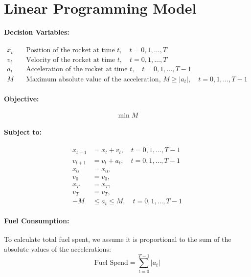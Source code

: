 \documentclass{article}
\begin{document}
\section*{Linear Programming Model}

\paragraph{Decision Variables:}
\begin{align*}
x_t &\quad \text{Position of the rocket at time } t, \quad t = 0, 1, \ldots, T \\
v_t &\quad \text{Velocity of the rocket at time } t, \quad t = 0, 1, \ldots, T \\
a_t &\quad \text{Acceleration of the rocket at time } t, \quad t = 0, 1, \ldots, T-1 \\
M &\quad \text{Maximum absolute value of the acceleration, } M \geq |a_t|, \quad t = 0, 1, \ldots, T-1
\end{align*}

\paragraph{Objective:}
\[
\min M
\]

\paragraph{Subject to:}
\begin{align*}
x_{t+1} &= x_t + v_t, \quad t = 0, 1, \ldots, T-1 \\
v_{t+1} &= v_t + a_t, \quad t = 0, 1, \ldots, T-1 \\
x_0 &= x_0, \\
v_0 &= v_0, \\
x_T &= x_T, \\
v_T &= v_T, \\
-M &\leq a_t \leq M, \quad t = 0, 1, \ldots, T-1
\end{align*}

\paragraph{Fuel Consumption:}
To calculate total fuel spent, we assume it is proportional to the sum of the absolute values of the accelerations:
\[
\text{Fuel Spend} = \sum_{t=0}^{T-1} |a_t|
\]
\end{document}

